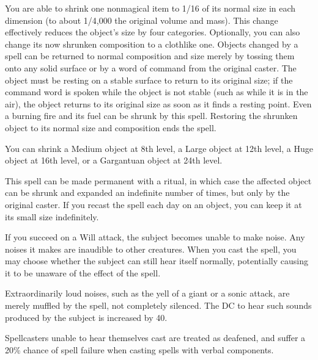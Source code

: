 \begin{spelleffect}
  You are able to shrink one nonmagical item to 1/16 of its normal size in each dimension (to about 1/4,000 the original volume and mass). This change effectively reduces the object's size by four categories. Optionally, you can also change its now shrunken composition to a clothlike one. Objects changed by a  spell can be returned to normal composition and size merely by tossing them onto any solid surface or by a word of command from the original caster. The object must be resting on a stable surface to return to its original size; if the command word is spoken while the object is not stable (such as while it is in the air), the object returns to its original size as soon as it finds a resting point. Even a burning fire and its fuel can be shrunk by this spell. Restoring the shrunken object to its normal size and composition ends the spell.
  \par You can shrink a Medium object at 8th level, a Large object at 12th level, a Huge object at 16th level, or a Gargantuan object at 24th level.
\end{spelleffect}
\begin{spellnotes}
This spell can be made permanent with a  ritual, in which case the affected object can be shrunk and expanded an indefinite number of times, but only by the original caster. If you recast the spell each day on an object, you can keep it at its small size indefinitely.
\end{spellnotes}

\spellrng{\rngmed}
\begin{spelleffect}
    If you succeed on a Will attack, the subject becomes unable to make noise. Any noises it makes are inaudible to other creatures. When you cast the spell, you may choose whether the subject can still hear itself normally, potentially causing it to be unaware of the effect of the spell.

Extraordinarily loud noises, such as the yell of a giant or a sonic attack, are merely muffled by the spell, not completely silenced. The DC to hear such sounds produced by the subject is increased by 40.
\end{spelleffect}
\begin{spellnotes}
    Spellcasters unable to hear themselves cast are treated as deafened, and suffer a 20\% chance of spell failure when casting spells with verbal components.
\end{spellnotes}

